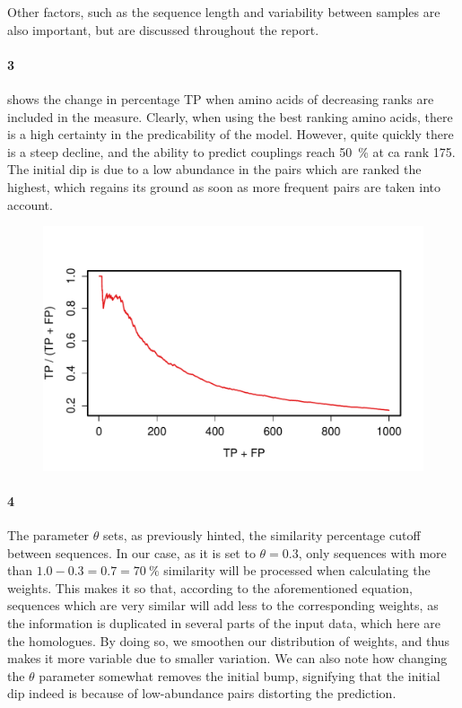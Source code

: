 \documentclass[11pt]{article}\usepackage[]{graphicx}\usepackage[]{color}
\makeatletter
\def\maxwidth{ %
  \ifdim\Gin@nat@width>\linewidth
    \linewidth
  \else
    \Gin@nat@width
  \fi
}
\theoremstyle{plain}
\makeatother
\begin{document}
\begin{multicols*}{2}
	Other factors, such as the sequence length and variability between samples are also important, but are discussed throughout the report.
	
	\paragraph{3}
	 shows the change in percentage TP when amino acids of decreasing ranks are included in the measure. Clearly, when using the best ranking amino acids, there is a high certainty in the predicability of the model. However, quite quickly there is a steep decline, and the ability to predict couplings reach  50~\% at ca rank 175. The initial dip is due to a low abundance in the pairs which are ranked the highest, which regains its ground as soon as more frequent pairs are taken into account.
\begin{Schunk}
\begin{figure}[H]

{\centering \includegraphics[width=\maxwidth]{figure/twocolumn-TP_plot-1} 

}

\caption[ ]{ }\label{fig:TP_plot}
\end{figure}
\end{Schunk}
	
	\paragraph{4}
	The parameter $\theta$ sets, as previously hinted, the similarity percentage cutoff between sequences. In our case, as it is set to $\theta = 0.3$, only sequences with more than $1.0 - 0.3 = 0.7 = 70~\%$ similarity will be processed when calculating the weights. This makes it so that, according to the aforementioned equation, sequences which are very similar will add less to the corresponding weights, as the information is duplicated in several parts of the input data, which here are the homologues. By doing so, we smoothen our distribution of weights, and thus makes it more variable due to smaller variation. We can also note how changing the $\theta$ parameter somewhat removes the initial bump, signifying that the initial dip indeed is because of low-abundance pairs distorting the prediction.
	

\end{multicols*}
\end{document}
